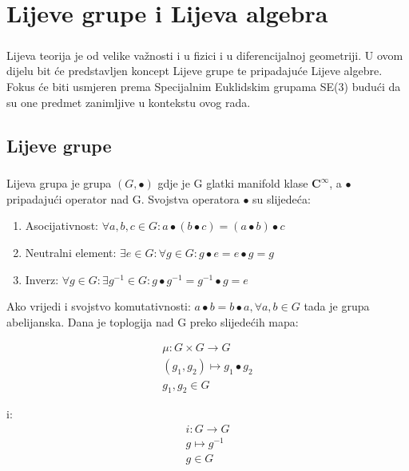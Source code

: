 \documentclass[times, utf8, diplomski, numeric]{fer}
\begin{document}
\chapter{Lijeve grupe i Lijeva algebra}

	\paragraph{}Lijeva teorija je od velike važnosti i u fizici i u diferencijalnoj geometriji. U ovom dijelu bit će predstavljen koncept Lijeve grupe te pripadajuće Lijeve algebre. Fokus će biti usmjeren prema Specijalnim Euklidskim grupama SE(3) budući da su one predmet zanimljive u kontekstu ovog rada.
	
\section{Lijeve grupe}

	\paragraph{} Lijeva grupa je grupa $(G, \bullet)$ gdje je G glatki manifold klase $\boldsymbol{C}^\infty$, a $\bullet$ pripadajući operator nad G. Svojstva operatora $\bullet$ su slijedeća: 
	\begin{enumerate}
		\item Asocijativnost: $\forall a, b, c \in G :  a\bullet(b\bullet c) = (a\bullet b) \bullet c$
		\item Neutralni element: $\exists e \in G : \forall g \in G : g \bullet e = e \bullet g = g$
		\item Inverz: $\forall g \in G : \exists g^{-1} \in G : g \bullet g^{-1} = g^{-1} \bullet g = e$
	\end{enumerate}
	Ako vrijedi i svojstvo komutativnosti: $a \bullet b = b \bullet a, \forall a, b \in G$ tada je grupa abelijanska. Dana je toplogija nad G preko slijedećih mapa:
	
	\begin{gather}
		\mu: G \times G \rightarrow G \\
		(g_1, g_2) \mapsto g_1 \bullet g_2 \\ g_1, g_2 \in G
	\end{gather}
	
	i: 
	\begin{gather}
		i: G \rightarrow G \\
		g \mapsto g^{-1} \\
		g \in G
	\end{gather}
	
\end{document}
